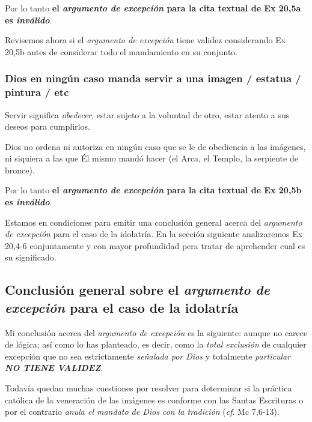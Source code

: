 \documentclass{article}
\begin{document}
Por lo tanto \textbf{el \emph{argumento de excepci\'on} para la cita textual de Ex 20,5a es \emph{inv\'alido}}.

Revisemos ahora si el \emph{argumento de excepci\'on} tiene validez considerando Ex 20,5b antes de considerar todo el mandamiento en su conjunto.

\subsubsection{Dios en ning\'un caso manda servir a una imagen / estatua / pintura / etc}

Servir significa \emph{obedecer}, estar sujeto a la voluntad de otro, estar atento a sus deseos para cumplirlos.

Dios no ordena ni autoriza en ning\'un caso que se le de obediencia a las im\'agenes, ni siquiera a las que \'El mismo mand\'o hacer (el Arca, el Templo, la serpiente de bronce).

Por lo tanto \textbf{el \emph{argumento de excepci\'on} para la cita textual de Ex 20,5b es \emph{inv\'alido}}.

Estamos en condiciones para emitir una conclusi\'on general acerca del \emph{argumento de excepci\'on} para el caso de la idolatr\'{i}a. En la secci\'on siguiente analizaremos Ex 20,4-6 conjuntamente y con mayor profundidad pera tratar de aprehender cual es su significado.

\subsection{Conclusi\'on general sobre el \emph{argumento de excepci\'on} para el caso de la idolatr\'{i}a}

Mi conclusi\'on acerca del \emph{argumento de excepci\'on} es la siguiente: aunque no carece de l\'ogica; as\'{i} como lo has planteado, es decir, como la \emph{total exclusi\'on} de cualquier excepci\'on que no sea estrictamente \emph{se\~nalada por Dios} y totalmente \emph{particular} \textbf{\emph{NO TIENE VALIDEZ}}.



\noindent
Todav\'{i}a quedan muchas cuestiones por resolver para determinar si la pr\'actica cat\'olica de la veneraci\'on de las im\'agenes es conforme con las Santas Escrituras o por el contrario \emph{anula el mandato de Dios con la tradici\'on} (\emph{cf}. Mc 7,6-13).
\end{document}
